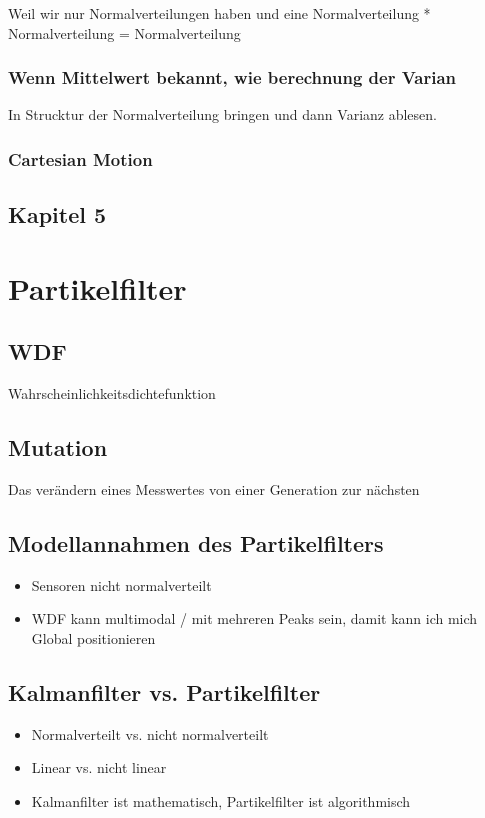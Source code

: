 Weil wir nur Normalverteilungen haben und eine Normalverteilung * Normalverteilung = Normalverteilung
\subsection{Wenn Mittelwert bekannt, wie berechnung der Varian}
In Strucktur der Normalverteilung bringen und dann Varianz ablesen.
\subsection{Cartesian Motion}





\section{Kapitel 5}
\label{sec:faq:kap5}

\newpage

\chapter{Partikelfilter}
\label{kap6Partikelfilter}


	
	\section{WDF}
	Wahrscheinlichkeitsdichtefunktion \cite{wdf}
	
	\section{Mutation}
	Das verändern eines Messwertes von einer Generation zur nächsten
	
	\section{Modellannahmen des Partikelfilters}
	
	\begin{itemize}
		\item Sensoren nicht normalverteilt
		\item WDF kann multimodal / mit mehreren Peaks sein, damit kann ich mich Global positionieren
	\end{itemize}
	

		
	
	\section{Kalmanfilter vs. Partikelfilter}	
		\begin{itemize}
		\item Normalverteilt vs. nicht normalverteilt
		\item Linear vs. nicht linear
		\item Kalmanfilter ist mathematisch, Partikelfilter ist algorithmisch
	\end{itemize}

